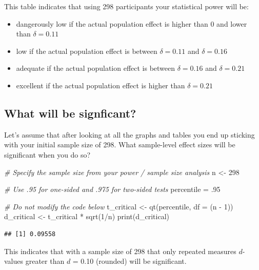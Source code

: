 \documentclass[
]{krantz}
\makeatletter
\newenvironment{Shaded}{\begin{snugshade}}{\end{snugshade}}
\newcommand{\AttributeTok}[1]{\textcolor[rgb]{0.61,0.61,0.61}{#1}}
\newcommand{\CommentTok}[1]{\textcolor[rgb]{0.37,0.37,0.37}{\textit{#1}}}
\newcommand{\DecValTok}[1]{\textcolor[rgb]{0.06,0.06,0.06}{#1}}
\newcommand{\FunctionTok}[1]{\textcolor[rgb]{0,0,0}{#1}}
\newcommand{\NormalTok}[1]{#1}
\newcommand{\OtherTok}[1]{\textcolor[rgb]{0.37,0.37,0.37}{#1}}
\newcommand{\SpecialCharTok}[1]{\textcolor[rgb]{0,0,0}{#1}}
\newenvironment{kframe}{%
\medskip{}
\setlength{\fboxsep}{.8em}
 \def\at@end@of@kframe{}%
 \ifinner\ifhmode%
  \def\at@end@of@kframe{\end{minipage}}%
  \begin{minipage}{\columnwidth}%
 \fi\fi%
 \def\FrameCommand##1{\hskip\@totalleftmargin \hskip-\fboxsep
 \colorbox{shadecolor}{##1}\hskip-\fboxsep
     \hskip-\linewidth \hskip-\@totalleftmargin \hskip\columnwidth}%
 \MakeFramed {\advance\hsize-\width
   \@totalleftmargin\z@ \linewidth\hsize
   \@setminipage}}%
 {\par\unskip\endMakeFramed%
 \at@end@of@kframe}
\renewenvironment{Shaded}{\begin{kframe}}{\end{kframe}}
\makeatother
\begin{document}
This table indicates that using 298 participants your statistical power will be:

\begin{itemize}
\item
  dangerously low if the actual population effect is higher than 0 and lower than \(\delta = 0.11\)
\item
  low if the actual population effect is between \(\delta = 0.11\) and \(\delta = 0.16\)
\item
  adequate if the actual population effect is between \(\delta = 0.16\) and \(\delta = 0.21\)
\item
  excellent if the actual population effect is higher than \(\delta = 0.21\)
\end{itemize}

\hypertarget{what-will-be-signficant-1}{%
\subsection{What will be signficant?}\label{what-will-be-signficant-1}}

Let's assume that after looking at all the graphs and tables you end up sticking with your initial sample size of 298. What sample-level effect sizes will be significant when you do so?

\begin{Shaded}
\begin{Highlighting}[]
\CommentTok{\# Specify the sample size from your power / sample size analysis}
\NormalTok{n }\OtherTok{\textless{}{-}} \DecValTok{298}

\CommentTok{\# Use .95 for one{-}sided and .975 for two{-}sided tests}
\NormalTok{percentile }\OtherTok{=}\NormalTok{ .}\DecValTok{95} 

\CommentTok{\# Do not modify the code below}
\NormalTok{t\_critical }\OtherTok{\textless{}{-}} \FunctionTok{qt}\NormalTok{(percentile, }\AttributeTok{df =}\NormalTok{ (n }\SpecialCharTok{{-}} \DecValTok{1}\NormalTok{))}
\NormalTok{d\_critical }\OtherTok{\textless{}{-}}\NormalTok{ t\_critical }\SpecialCharTok{*} \FunctionTok{sqrt}\NormalTok{(}\DecValTok{1}\SpecialCharTok{/}\NormalTok{n)}
\FunctionTok{print}\NormalTok{(d\_critical)}
\end{Highlighting}
\end{Shaded}

\begin{verbatim}
## [1] 0.09558
\end{verbatim}

This indicates that with a sample size of 298 that only repeated measures \(d\)-values greater than \(d\) = 0.10 (rounded) will be significant.
\end{document}
